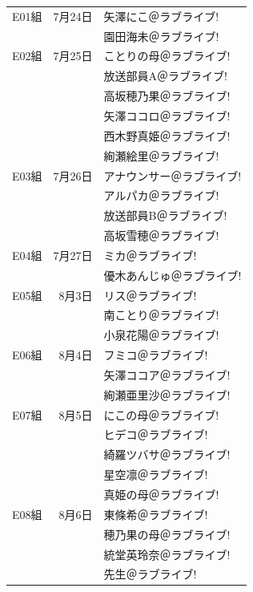 \def\iD{\mincho}
\def\iA{\toppanb\cellcolor{lovelive}}
\def\iB{\toppanb}
{\mincho{}
\begin{longtable}{|rrl|}\hline
E01組 & 7月24日 & \iA 矢澤にこ＠ラブライブ!\\
      &         & \iA 園田海未＠ラブライブ!\\\hline
E02組 & 7月25日 & \iD ことりの母＠ラブライブ!\\
      &         & \iD 放送部員A＠ラブライブ!\\
      &         & \iA 高坂穂乃果＠ラブライブ!\\
      &         & \iB 矢澤ココロ＠ラブライブ!\\
      &         & \iA 西木野真姫＠ラブライブ!\\
      &         & \iA 絢瀬絵里＠ラブライブ!\\\hline
E03組 & 7月26日 & \iD アナウンサー＠ラブライブ!\\
      &         & \iD アルパカ＠ラブライブ!\\
      &         & \iD 放送部員B＠ラブライブ!\\
      &         & \iB 高坂雪穂＠ラブライブ!\\\hline
E04組 & 7月27日 & \iD ミカ＠ラブライブ!\\
      &         & \iB 優木あんじゅ＠ラブライブ!\\\hline
E05組 & 8月3日  & \iD リス＠ラブライブ!\\
      &         & \iA 南ことり＠ラブライブ!\\
      &         & \iA 小泉花陽＠ラブライブ!\\\hline
E06組 & 8月4日  & \iD フミコ＠ラブライブ!\\
      &         & \iB 矢澤ココア＠ラブライブ!\\
      &         & \iB 絢瀬亜里沙＠ラブライブ!\\\hline
E07組 & 8月5日  & \iD にこの母＠ラブライブ!\\
      &         & \iD ヒデコ＠ラブライブ!\\
      &         & \iB 綺羅ツバサ＠ラブライブ!\\
      &         & \iA 星空凛＠ラブライブ!\\
      &         & \iD 真姫の母＠ラブライブ!\\\hline
E08組 & 8月6日  & \iA 東條希＠ラブライブ!\\
      &         & \iD 穂乃果の母＠ラブライブ!\\
      &         & \iB 統堂英玲奈＠ラブライブ!\\
      &         & \iD 先生＠ラブライブ!\\\hline
\end{longtable}}

